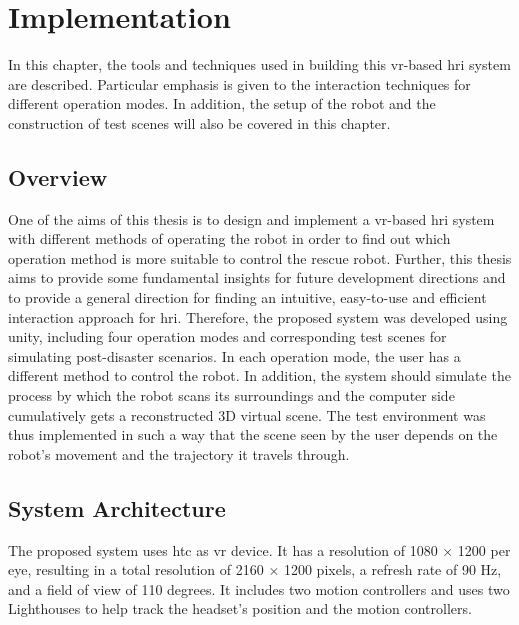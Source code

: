 \chapter{Implementation}
\label{implementation}

In this chapter, the tools and techniques used in building this \gls{vr}-based \gls{hri} system are described. Particular emphasis is given to the interaction techniques for different operation modes. In addition, the setup of the robot and the construction of test scenes will also be covered in this chapter.


\section{Overview}
One of the aims of this thesis is to design and implement a \gls{vr}-based \gls{hri} system with different methods of operating the robot in order to find out which operation method is more suitable to control the rescue robot. Further, this thesis aims to provide some fundamental insights for future development directions and to provide a general direction for finding an intuitive, easy-to-use and efficient interaction approach for \gls{hri}. Therefore, the proposed system was developed using \gls{unity}, including four operation modes and corresponding test scenes for simulating post-disaster scenarios. In each operation mode, the user has a different method to control the robot. In addition, the system should simulate the process by which the robot scans its surroundings and the computer side cumulatively gets a reconstructed 3D virtual scene. The test environment was thus implemented in such a way that the scene seen by the user depends on the robot's movement and the trajectory it travels through.

\section{System Architecture}
The proposed system uses \gls{htc} as \gls{vr} device. It has a resolution of 1080 × 1200 per eye, resulting in a total resolution of 2160 × 1200 pixels, a refresh rate of 90 Hz, and a field of view of 110 degrees. It includes two motion controllers and uses two Lighthouses to help track the headset's position and the motion controllers.

